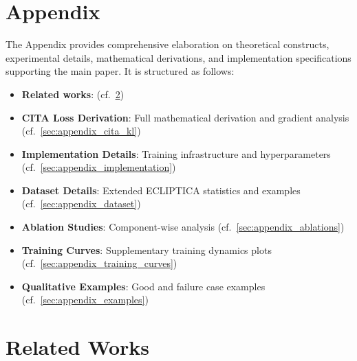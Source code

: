 
\newpage
\appendix

\onecolumn

\section{Appendix}
\label{sec:appendix}

The Appendix provides comprehensive elaboration on theoretical constructs, experimental details, mathematical derivations, and implementation specifications supporting the main paper. It is structured as follows:

\begin{itemize}[leftmargin=*,itemsep=2pt]
    \item \textbf{Related works}: (cf.~\cref{sec:appendix_related})
    \item \textbf{CITA Loss Derivation}: Full mathematical derivation and gradient analysis (cf.~\cref{sec:appendix_cita_kl})
    \item \textbf{Implementation Details}: Training infrastructure and hyperparameters (cf.~\cref{sec:appendix_implementation})
    \item \textbf{Dataset Details}: Extended ECLIPTICA statistics and examples (cf.~\cref{sec:appendix_dataset})
    \item \textbf{Ablation Studies}: Component-wise analysis (cf.~\cref{sec:appendix_ablations})
    \item \textbf{Training Curves}: Supplementary training dynamics plots (cf.~\cref{sec:appendix_training_curves})
    \item \textbf{Qualitative Examples}: Good and failure case examples (cf.~\cref{sec:appendix_examples})
\end{itemize}



\vspace{-3mm}
\section{Related Works}
\label{sec:appendix_related}

